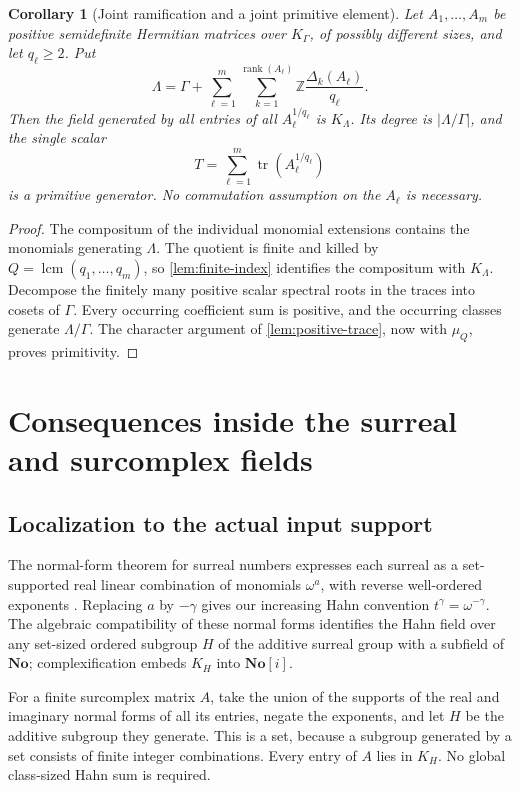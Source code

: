 \documentclass[11pt,letterpaper]{article}
\numberwithin{equation}{section}
\newtheorem{corollary}[theorem]{Corollary}
\theoremstyle{definition}
\theoremstyle{remark}
\newcommand{\Z}{\mathbb Z}
\newcommand{\No}{\mathbf{No}}
\newcommand{\SC}{\mathbf{No}[i]}
\newcommand{\tr}{\operatorname{tr}}
\newcommand{\rank}{\operatorname{rank}}
\newcommand{\lcm}{\operatorname{lcm}}
\newcommand{\KG}{K_{\Gamma}}
\begin{document}
\begin{corollary}[Joint ramification and a joint primitive element]\label{cor:joint}
Let $A_1,\ldots,A_m$ be positive semidefinite Hermitian matrices over
$\KG$, of possibly different sizes, and let $q_\ell\ge2$.
Put
\[
 \Lambda=\Gamma+
  \sum_{\ell=1}^m\sum_{k=1}^{\rank(A_\ell)}
       \Z\frac{\Delta_k(A_\ell)}{q_\ell}.
\]
Then the field generated by all entries of all $A_\ell^{1/q_\ell}$ is
$K_\Lambda$. Its degree is $|\Lambda/\Gamma|$, and the single scalar
\[
 T=\sum_{\ell=1}^m\tr(A_\ell^{1/q_\ell})
\]
is a primitive generator. No commutation assumption on the $A_\ell$ is
necessary.
\end{corollary}
\begin{proof}
The compositum of the individual monomial extensions contains the monomials
generating $\Lambda$. The quotient is finite and killed by
$Q=\lcm(q_1,\ldots,q_m)$, so \cref{lem:finite-index} identifies the compositum
with $K_\Lambda$. Decompose the finitely many positive scalar spectral roots
in the traces into cosets of $\Gamma$. Every occurring coefficient sum is
positive, and the occurring classes generate $\Lambda/\Gamma$. The character
argument of \cref{lem:positive-trace}, now with $\mu_Q$, proves primitivity.
\end{proof}

\section{Consequences inside the surreal and surcomplex fields}
\label{sec:surreal}

\subsection{Localization to the actual input support}

The normal-form theorem for surreal numbers expresses each surreal as a
set-supported real linear combination of monomials $\omega^a$, with reverse
well-ordered exponents \cite{Gonshor}. Replacing $a$ by $-\gamma$ gives our
increasing Hahn convention $t^\gamma=\omega^{-\gamma}$.
The algebraic compatibility of these normal forms identifies the Hahn field
over any set-sized ordered subgroup $H$ of the additive surreal group with
a subfield of $\No$; complexification embeds $K_H$ into $\SC$.

For a finite surcomplex matrix $A$, take the union of the supports of the
real and imaginary normal forms of all its entries, negate the exponents,
and let $H$ be the additive subgroup they generate. This is a set, because
a subgroup generated by a set consists of finite integer combinations.
Every entry of $A$ lies in $K_H$. No global class-sized Hahn sum is required.
\end{document}
